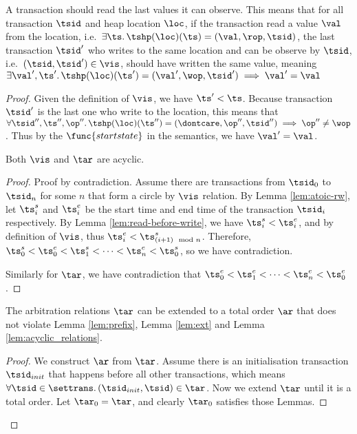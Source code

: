 \begin{lem}[ext]
    \label{lem:ext}
    A transaction should read the last values it can observe.
    This means that for all transaction \( \tsid \) and heap location \( \loc \), if the transaction read a value \( \val \) from the location, i.e.\ \( \exists \ts \ldotp \tshp(\loc)(\ts) = (\val, \rop, \tsid) \), the last transaction \( \tsid' \) who writes to the same location and can be observe by \( \tsid \), i.e.\ \( (\tsid, \tsid') \in \vis\), should have written the same value, meaning \( \exists \val', \ts' \ldotp \tshp(\loc)(\ts') = (\val', \wop, \tsid') \implies \val' = \val\)
\end{lem}
\begin{proof}
    Given the definition of \( \vis \), we have \( \ts' < \ts \).
    Because transaction \( \tsid' \) is the last one who write to the location, this means that \( \forall \tsid'', \ts'', \op'' \ldotp \tshp(\loc)(\ts'') = (\dontcare, \op'', \tsid'') \implies \op'' \neq \wop \).
    Thus by the \( \func{startstate} \) in the semantics, we have \( \val' = \val \).


\begin{lem}[acyclic]
    \label{lem:acyclic_relations}
    Both \( \vis \) and \( \tar \) are acyclic.
\end{lem}
\begin{proof}
    Proof by contradiction.
    Assume there are transactions from \( \tsid_{0} \) to \( \tsid_{n} \)  for some \( n \) that form a circle by \( \vis \) relation.
    By Lemma \ref{lem:atoic-rw}, let \( \ts^{s}_{i} \) and \( \ts^{e}_{i} \) be the start time and end time of the transaction \( \tsid_{i} \) respectively.
    By Lemma \ref{lem:read-before-write}, we have \( \ts^{s}_{i} < \ts^{e}_{i} \), and by definition of \( \vis \), thus \( \ts^{e}_{i} < \ts^{s}_{(i+1)\mod n} \).
    Therefore, \( \ts^{s}_{0} < \ts^{e}_{0} < \ts^{s}_{1} < \dots <  \ts^{e}_{n} < \ts^{s}_{0} \), so we have contradiction.

    Similarly for \( \tar \), we have contradiction that \( \ts^{e}_{0} < \ts^{e}_{1} < \dots  < \ts^{e}_{n} < \ts^{e}_{0} \).
\end{proof}

\begin{lem}[totalorder]
    The arbitration relations \( \tar \) can be extended to a total order \( \ar \) that does not violate Lemma \ref{lem:prefix}, Lemma \ref{lem:ext} and Lemma \ref{lem:acyclic_relations}.
\end{lem}
\begin{proof}
    We construct \( \ar \) from \( \tar \).
    Assume there is an initialisation transaction \( \tsid_{init} \) that happens before all other transactions, which means \( \forall \tsid \in \settrans \ldotp (\tsid_{init} , \tsid ) \in \tar\).
    Now we extend \( \tar \) until it is a total order.
    Let \( \tar_{0} = \tar \), and clearly \( \tar_{0} \) satisfies those Lemmas.


\end{proof}
\end{proof}
